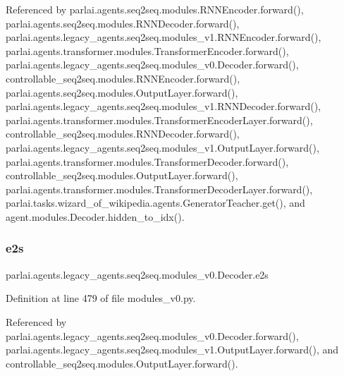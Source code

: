 Referenced by parlai.\+agents.\+seq2seq.\+modules.\+R\+N\+N\+Encoder.\+forward(), parlai.\+agents.\+seq2seq.\+modules.\+R\+N\+N\+Decoder.\+forward(), parlai.\+agents.\+legacy\+\_\+agents.\+seq2seq.\+modules\+\_\+v1.\+R\+N\+N\+Encoder.\+forward(), parlai.\+agents.\+transformer.\+modules.\+Transformer\+Encoder.\+forward(), parlai.\+agents.\+legacy\+\_\+agents.\+seq2seq.\+modules\+\_\+v0.\+Decoder.\+forward(), controllable\+\_\+seq2seq.\+modules.\+R\+N\+N\+Encoder.\+forward(), parlai.\+agents.\+seq2seq.\+modules.\+Output\+Layer.\+forward(), parlai.\+agents.\+legacy\+\_\+agents.\+seq2seq.\+modules\+\_\+v1.\+R\+N\+N\+Decoder.\+forward(), parlai.\+agents.\+transformer.\+modules.\+Transformer\+Encoder\+Layer.\+forward(), controllable\+\_\+seq2seq.\+modules.\+R\+N\+N\+Decoder.\+forward(), parlai.\+agents.\+legacy\+\_\+agents.\+seq2seq.\+modules\+\_\+v1.\+Output\+Layer.\+forward(), parlai.\+agents.\+transformer.\+modules.\+Transformer\+Decoder.\+forward(), controllable\+\_\+seq2seq.\+modules.\+Output\+Layer.\+forward(), parlai.\+agents.\+transformer.\+modules.\+Transformer\+Decoder\+Layer.\+forward(), parlai.\+tasks.\+wizard\+\_\+of\+\_\+wikipedia.\+agents.\+Generator\+Teacher.\+get(), and agent.\+modules.\+Decoder.\+hidden\+\_\+to\+\_\+idx().

\mbox{\label{classparlai_1_1agents_1_1legacy__agents_1_1seq2seq_1_1modules__v0_1_1Decoder_a39ba174b9c80cdf061b125740bff362b}} 
\subsubsection{\texorpdfstring{e2s}{e2s}}
{\footnotesize\ttfamily parlai.\+agents.\+legacy\+\_\+agents.\+seq2seq.\+modules\+\_\+v0.\+Decoder.\+e2s}



Definition at line 479 of file modules\+\_\+v0.\+py.



Referenced by parlai.\+agents.\+legacy\+\_\+agents.\+seq2seq.\+modules\+\_\+v0.\+Decoder.\+forward(), parlai.\+agents.\+legacy\+\_\+agents.\+seq2seq.\+modules\+\_\+v1.\+Output\+Layer.\+forward(), and controllable\+\_\+seq2seq.\+modules.\+Output\+Layer.\+forward().

